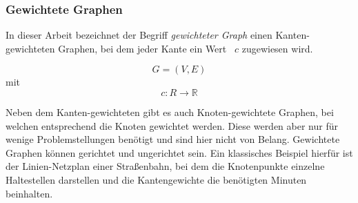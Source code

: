 \documentclass[12pt,a4paper]{article}
\begin{document}
\subsubsection{Gewichtete Graphen}
In dieser Arbeit bezeichnet der Begriff \textit{gewichteter Graph} einen Kanten-gewichteten Graphen, bei dem jeder Kante ein Wert ~$c$ zugewiesen wird.

$$G = (V,E)$$ mit $$c: R \rightarrow \mathbb{R}$$

Neben dem Kanten-gewichteten gibt es auch Knoten-gewichtete Graphen, bei welchen entsprechend die Knoten gewichtet werden. Diese werden aber nur für wenige Problemstellungen benötigt und sind hier nicht von Belang. Gewichtete Graphen können gerichtet und ungerichtet sein. Ein klassisches Beispiel hierfür ist der Linien-Netzplan einer Straßenbahn, bei dem die Knotenpunkte einzelne Haltestellen darstellen und die Kantengewichte die benötigten Minuten beinhalten.
\end{document}
